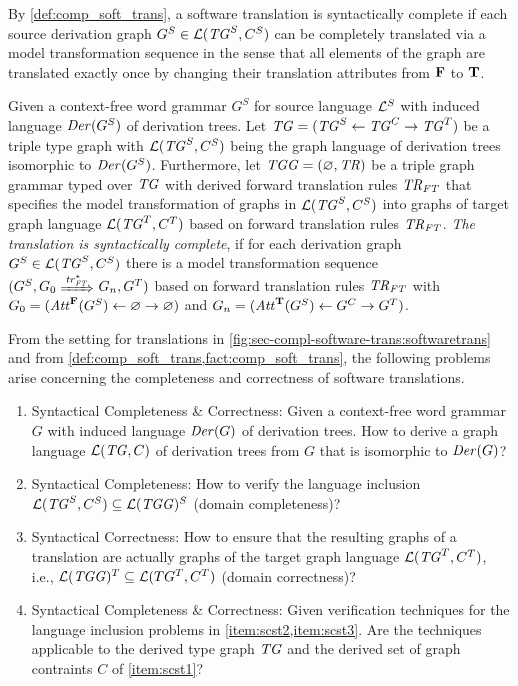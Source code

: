 By \cref{def:comp_soft_trans}, a software translation is syntactically complete if each source derivation graph $G^S \in \mathcal{L}(\mathit{TG}^S,C^S)$ can be completely translated via a model transformation sequence in the sense that all elements of the graph are translated exactly once by changing their translation attributes from $\mathbf{F}$ to $\mathbf{T}$.

\begin{definition}
\label{def:comp_soft_trans}
Given a context-free word grammar $G^S$ for source language $\mathcal{L}^S$ with induced language $\mathit{Der}(G^S)$ of derivation trees.
Let $\mathit{TG}=(\mathit{TG}^S \gets \mathit{TG}^C \to \mathit{TG}^T)$ be a triple type graph with $\mathcal{L}(\mathit{TG}^S,C^S)$ being the graph language of derivation trees isomorphic to $\mathit{Der}(G^S)$. 
Furthermore, let $\mathit{TGG}=(\varnothing,\mathit{TR})$ be a triple graph grammar typed over $\mathit{TG}$ with derived forward translation rules $\mathit{TR}_\mathit{FT}$ that specifies the model transformation of graphs in $\mathcal{L}(\mathit{TG}^S,C^S)$ into graphs of target graph language $\mathcal{L}(\mathit{TG}^T,C^T)$ based on forward translation rules $\mathit{TR}_\mathit{FT}$.
\emph{The translation is syntactically complete}, if for each derivation graph $G^S \in \mathcal{L}(\mathit{TG}^S,C^S)$ there is a model transformation sequence $(G^S,G_0 \Trans{\tr^*_\FT} G_n,G^T)$ based on forward translation rules $\mathit{TR}_\mathit{FT}$ with $G_0=(\mathit{Att}^\mathbf{F}(G^S) \gets \varnothing \to \varnothing)$ and $G_n=(\mathit{Att}^\mathbf{T}(G^S) \gets G^C \to G^T)$.\envEndMarker
\end{definition}

From the setting for translations in \cref{fig:sec-compl-software-trans:softwaretrans} and from \cref{def:comp_soft_trans,fact:comp_soft_trans}, the following problems arise concerning the completeness and correctness of software translations.

\begin{problem}
\label{prob:scst}
\begin{enumerate}
  \item \label{item:scst1} Syntactical Completeness \& Correctness: Given a context-free word grammar $G$ with induced language $\mathit{Der}(G)$ of derivation trees.
  How to derive a graph language $\mathcal{L}(\mathit{TG},C)$ of derivation trees from $G$ that is isomorphic to $\mathit{Der}(G)$?
  \item \label{item:scst2} Syntactical Completeness: How to verify the language inclusion $\mathcal{L}(\mathit{TG}^S,C^S) \subseteq \mathcal{L}(\mathit{TGG})^S$ (domain completeness)?
  \item \label{item:scst3} Syntactical Correctness: How to ensure that the resulting graphs of a translation are actually graphs of the target graph language $\mathcal{L}(\mathit{TG}^T,C^T)$, i.e., $\mathcal{L}(\mathit{TGG})^T \subseteq \mathcal{L}(TG^T,C^T)$ (domain correctness)?
  \item \label{item:scst4} Syntactical Completeness \& Correctness: Given verification techniques for the language inclusion problems in \cref{item:scst2,item:scst3}.
  Are the techniques applicable to the derived type graph $\mathit{TG}$ and the derived set of graph contraints $C$ of \cref{item:scst1}?\envEndMarker
\end{enumerate}
\end{problem}

